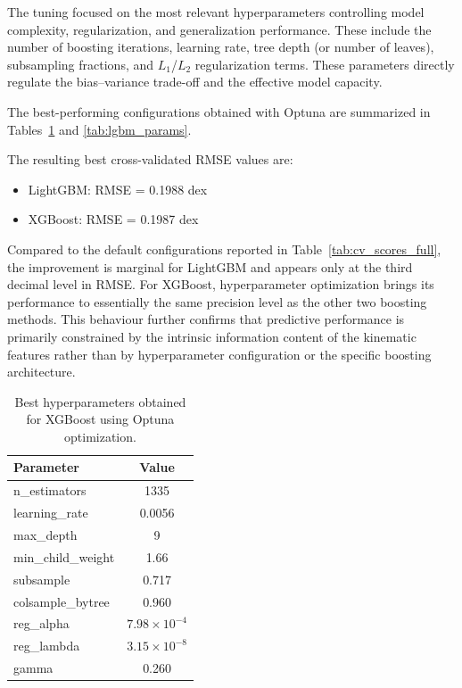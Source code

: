 \documentclass{aa}
\begin{document}
\begin{appendix}
The tuning focused on the most relevant hyperparameters controlling model complexity, regularization, and generalization performance. These include the number of boosting iterations, learning rate, tree depth (or number of leaves), subsampling fractions, and $L_1$/$L_2$ regularization terms. These parameters directly regulate the bias–variance trade-off and the effective model capacity.

The best-performing configurations obtained with Optuna are summarized in Tables~\ref{tab:xgb_params} and \ref{tab:lgbm_params}.

The resulting best cross-validated RMSE values are:

\begin{itemize}
\item LightGBM: RMSE = 0.1988 dex
\item XGBoost: RMSE = 0.1987 dex
\end{itemize}

Compared to the default configurations reported in Table~\ref{tab:cv_scores_full}, the improvement is marginal for LightGBM and appears only at the third decimal level in RMSE. For XGBoost, hyperparameter optimization brings its performance to essentially the same precision level as the other two boosting methods. This behaviour further confirms that predictive performance is primarily constrained by the intrinsic information content of the kinematic features rather than by hyperparameter configuration or the specific boosting architecture.


\begin{table}[h]
\caption{Best hyperparameters obtained for XGBoost using Optuna optimization.}
\label{tab:xgb_params}
\centering
\begin{tabular}{lc}
\hline
Parameter & Value \\
\hline
n\_estimators & 1335 \\
learning\_rate & 0.0056 \\
max\_depth & 9 \\
min\_child\_weight & 1.66 \\
subsample & 0.717 \\
colsample\_bytree & 0.960 \\
reg\_alpha & $7.98\times10^{-4}$ \\
reg\_lambda & $3.15\times10^{-8}$ \\
gamma & 0.260 \\
\hline
\end{tabular}
\end{table}


\end{appendix}
\end{document}
